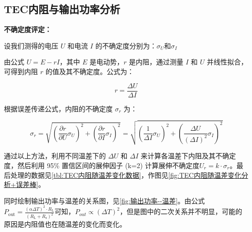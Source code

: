 \documentclass[dvipsnames, svgnames,a4paper,11pt]{article}
\begin{document}
    \subsection{TEC内阻与输出功率分析}

        \textbf{不确定度评定：}

        设我们测得的电压 \( U \) 和电流 \( I \) 的不确定度分别为：$\sigma_U$和$\sigma_I$

        
        由公式 \( U = E - rI \)，其中 \( E \) 是电动势，\( r \) 是内阻，通过测量 \( I \) 和 \( U \) 并线性拟合，可得到内阻 \( r \) 的值及其不确定度。公式为：
        
        \[ r = \frac{\Delta U}{\Delta I} \]
        
        根据误差传递公式，内阻的不确定度 \( \sigma_r \) 为：
        
        \[ \sigma_r = \sqrt{\left( \frac{\partial r}{\partial U} \sigma_U \right)^2 + \left( \frac{\partial r}{\partial I} \sigma_I \right)^2} = \sqrt{\left( \frac{1}{\Delta I} \sigma_U \right)^2 + \left( \frac{\Delta U}{(\Delta I)^2} \sigma_I \right)^2} \]
        

        
        通过以上方法，利用不同温差下的 \( \Delta U \) 和 \( \Delta I \) 来计算各温差下内阻及其不确定度，然后利用 95\% 置信区间的展伸因子 (k=2) 计算展伸不确定度$ U_r = k \cdot \sigma_r $。最后处理的数据见\cref{tbl:TEC内阻随温差变化数据}，作图见\cref{fig:TEC内阻随温差变化分析+误差棒}。

        同时绘制输出功率与温差的关系图，见\cref{fig:输出功率--温差}。由公式$P_{\text{out}} = \frac{(\alpha \Delta T)^2 \cdot R_{\text{L}}}{(R_{\text{L}} + R_{\text{s}})^2}$可知，$P_{out} \propto (\Delta T)^2 $，但是图中的二次关系并不明显，可能的原因是内阻值也在随温差的变化而变化。
        
\end{document}
